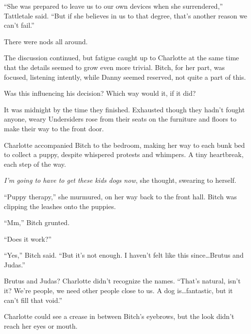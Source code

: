 ``She was prepared to leave us to our own devices when she surrendered,'' Tattletale said.  ``But if she believes in us to that degree, that's another reason we can't fail.''



There were nods all around.



The discussion continued, but fatigue caught up to Charlotte at the same time that the details seemed to grow even more trivial.  Bitch, for her part, was focused, listening intently, while Danny seemed reserved, not quite a part of this.



Was this influencing his decision?  Which way would it, if it did?



It was midnight by the time they finished.  Exhausted though they hadn't fought anyone, weary Undersiders rose from their seats on the furniture and floors to make their way to the front door.



Charlotte accompanied Bitch to the bedroom, making her way to each bunk bed to collect a puppy, despite whispered protests and whimpers.  A tiny heartbreak, each step of the way.



\emph{I'm going to have to get these kids dogs now}, she thought, swearing to herself.



``Puppy therapy,'' she murmured, on her way back to the front hall.  Bitch was clipping the leashes onto the puppies.



``Mm,'' Bitch grunted.



``Does it work?''



``Yes,'' Bitch said.  ``But it's not enough.  I haven't felt like this since\ldots Brutus and Judas.''



Brutus and Judas?  Charlotte didn't recognize the names.  ``That's natural, isn't it?  We're people, we need other people close to us.  A dog is\ldots fantastic, but it can't fill that void.''



Charlotte could see a crease in between Bitch's eyebrows, but the look didn't reach her eyes or mouth.



